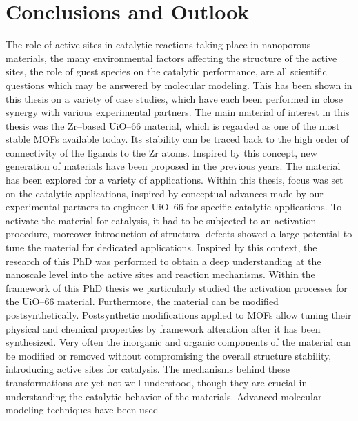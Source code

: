 \graphicspath{{figures/}}
\renewcommand\evenpagerightmark{{\scshape\small Conclusions and perspectives}} 
\renewcommand\oddpageleftmark{{\scshape\small Chapter 4}}


\hyphenation{}

\chapter[Conclusions and perspectives]%
{Conclusions and Outlook}
\label{ch4}
The role of active sites in catalytic reactions taking place in nanoporous
materials, the many environmental factors affecting the structure of the
active sites, the role of guest species on the catalytic performance, are
all scientific questions which may be answered by molecular modeling. This has
been shown in this thesis on a variety of case studies, which have each been performed in close synergy with various experimental partners.
\npar
The main material of interest in this thesis was the Zr--based UiO--66
material, which is regarded as one of the most stable MOFs available today. Its
stability can be traced back to the high order of connectivity of the ligands to
the Zr atoms. Inspired by this concept, new generation of materials have
been proposed in the previous years. The material has been explored for a
variety of applications. Within this thesis, focus was set on the catalytic applications, inspired by conceptual advances made by our experimental partners to engineer UiO--66 for specific catalytic applications. To activate the material for catalysis, it had to be subjected to an activation procedure, moreover introduction of structural defects showed a large potential to tune the material for dedicated applications.
Inspired by this context, the research of this PhD was performed to obtain a
deep understanding at the nanoscale level into the active sites and reaction
mechanisms. Within the framework of this PhD thesis we particularly studied the
activation processes for the UiO--66 material. Furthermore, the material can be
modified postsynthetically.  
Postsynthetic modifications applied to MOFs allow tuning their physical and
chemical properties by framework alteration after it has been synthesized. Very often the
inorganic and organic components of the material can be modified or removed without
compromising the overall structure stability, introducing active sites for
catalysis. The mechanisms behind these transformations are yet not well
understood, though they are crucial in understanding the catalytic behavior of the materials. Advanced molecular modeling techniques have been used
